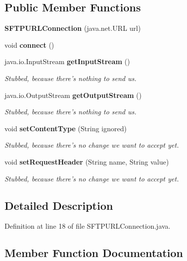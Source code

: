 \subsection*{Public Member Functions}
\begin{DoxyCompactItemize}
\item 
{\bfseries S\+F\+T\+P\+U\+R\+L\+Connection} (java.\+net.\+U\+R\+L url)\label{classorg_1_1smallfoot_1_1filexfer_1_1sftp_1_1SFTPURLConnection_a31333738e73c420407fe864e744eb5e3}

\item 
void {\bfseries connect} ()\label{classorg_1_1smallfoot_1_1filexfer_1_1sftp_1_1SFTPURLConnection_a1396bf9b5defe9fa844a63b5cd40ac0e}

\item 
java.\+io.\+Input\+Stream {\bf get\+Input\+Stream} ()
\begin{DoxyCompactList}\small\item\em Stubbed, because there's nothing to send us. \end{DoxyCompactList}\item 
java.\+io.\+Output\+Stream {\bf get\+Output\+Stream} ()
\begin{DoxyCompactList}\small\item\em Stubbed, because there's nothing to send us. \end{DoxyCompactList}\item 
void {\bf set\+Content\+Type} (String ignored)
\begin{DoxyCompactList}\small\item\em Stubbed, because there's no change we want to accept yet. \end{DoxyCompactList}\item 
void {\bf set\+Request\+Header} (String name, String value)
\begin{DoxyCompactList}\small\item\em Stubbed, because there's no change we want to accept yet. \end{DoxyCompactList}\end{DoxyCompactItemize}


\subsection{Detailed Description}


Definition at line 18 of file S\+F\+T\+P\+U\+R\+L\+Connection.\+java.



\subsection{Member Function Documentation}
